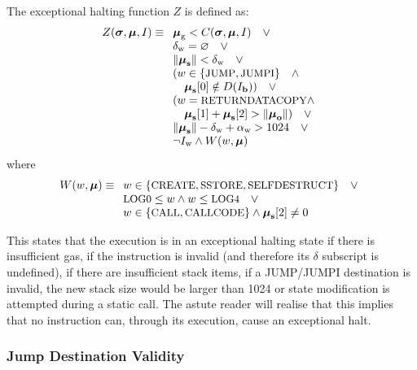 \documentclass[9pt,oneside]{amsart}
\begin{document}
\begin{multicols}{2}
The exceptional halting function $Z$ is defined as:
\begin{equation}
Z(\boldsymbol{\sigma}, \boldsymbol{\mu}, I) \equiv
\begin{array}[t]{l}
\boldsymbol{\mu}_{\mathrm{g}} < C(\boldsymbol{\sigma}, \boldsymbol{\mu}, I) \quad \vee \\
\mathbf{\delta}_{\mathrm{w}} = \varnothing \quad \vee \\
\lVert\boldsymbol{\mu}_{\mathbf{s}}\rVert < \mathbf{\delta}_{\mathrm{w}} \quad \vee \\
( w \in \{ \text{\small JUMP}, \text{\small JUMPI} \} \quad \wedge \\ \quad \boldsymbol{\mu}_{\mathbf{s}}[0] \notin D(I_{\mathbf{b}}) ) \quad \vee \\
( w = \text{\small RETURNDATACOPY} \wedge \\ \quad \boldsymbol{\mu}_{\mathbf{s}}[1] + \boldsymbol{\mu}_{\mathbf{s}}[2] > \lVert\boldsymbol{\mu}_{\mathbf{o}}\rVert) \quad \vee \\
 \lVert\boldsymbol{\mu}_{\mathbf{s}}\rVert - \mathbf{\delta}_{\mathrm{w}} + \mathbf{\alpha}_{\mathrm{w}} > 1024 \quad \vee \\
 \neg I_{\mathrm{w}} \wedge W(w, \boldsymbol{\mu})
\end{array}
\end{equation}
where
\begin{equation}
W(w, \boldsymbol{\mu}) \equiv \begin{array}[t]{l}
w \in \{\text{\small CREATE}, \text{\small SSTORE}, \text{\small SELFDESTRUCT}\} \quad \vee \\
\text{\small LOG0} \le w \wedge w \le \text{\small LOG4} \quad \vee \\
w \in \{\text{\small CALL}, \text{\small CALLCODE}\} \wedge \boldsymbol{\mu}_{\mathbf{s}}[2] \neq 0
\end{array}
\end{equation}

This states that the execution is in an exceptional halting state if there is insufficient gas, if the instruction is invalid (and therefore its $\delta$ subscript is undefined), if there are insufficient stack items, if a {\small JUMP}/{\small JUMPI} destination is invalid, the new stack size would be larger than 1024 or state modification is attempted during a static call. The astute reader will realise that this implies that no instruction can, through its execution, cause an exceptional halt.

\subsubsection{Jump Destination Validity}


\end{multicols}
\end{document}
